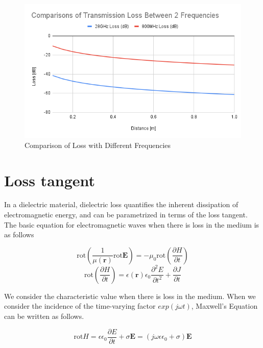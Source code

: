 \documentclass[a4paper,12pt]{report}
\begin{document}
\begin{figure}
  \begin{center}
    \includegraphics[clip, keepaspectratio, width=0.7\linewidth]{img/loss_comparison.png}
    \caption{Comparison of Loss with Different Frequencies}
    \label{fig:loss_comparison}
  \end{center}
\end{figure}

\section{Loss tangent}

In a dielectric material, dielectric loss quantifies the inherent dissipation
of electromagnetic energy, and can be parametrized in terms of the loss tangent.
The basic equation for electromagnetic waves
when there is loss in the medium is as follows

\begin{equation}
  \mathrm{rot}(\frac{1}{\mu(\boldsymbol{r})}\mathrm{rot}\boldsymbol{E}) = -\mu_0 \mathrm{rot}(\frac{\partial H}{\partial t})
\end{equation}
\begin{equation}
  \mathrm{rot}(\frac{\partial H}{\partial t}) = \epsilon(\boldsymbol{r})\epsilon_0 \frac{\partial^2 E}{\partial t^2} + \frac{\partial J}{\partial t}
\end{equation}


We consider the characteristic value when there is loss in the medium.
When we consider the incidence of the time-varying factor $exp(j\omega t)$,
Maxwell's Equation can be written as follows.

\begin{equation} \label{eq:loss_electric_flux_density}
  \mathrm{rot} H = \epsilon \epsilon_0 \frac{\partial E}{\partial t} + \sigma \boldsymbol{E} = (j\omega\epsilon\epsilon_0 + \sigma)\boldsymbol{E}
\end{equation}
\end{document}
